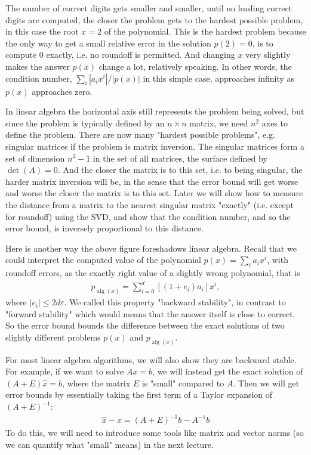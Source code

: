\documentclass[11pt]{article}
\numberwithin{equation}{section}
\begin{document}
The number of correct digits gets smaller and smaller, until no leading correct digits are computed, the closer the problem gets to the hardest possible problem, 
in this case the root $x=2$ of the polynomial. This is the hardest problem because the only way to get a small relative error in the solution $p(2)=0$, 
is to compute 0 exactly, i.e. no roundoff is permitted. And changing $x$ very slightly makes the answer $p(x)$ change a lot, relatively speaking. 
In other words, the condition number, $\sum_i |a_i x^i| / |p(x)|$ in this simple case, approaches infinity as $p(x)$ approaches zero.

In linear algebra the horizontal axis still represents the problem being solved, but since the problem is typically defined by an $n \times n$ matrix, 
we need $n^2$ axes to define the problem. There are now many "hardest possible problems", e.g. singular matrices if the problem is matrix inversion. 
The singular matrices form a set of dimension $n^2-1$ in the set of all matrices, the surface defined by $\operatorname{det}(A)=0$. And the closer the matrix is to this set, 
i.e. to being singular, the harder matrix inversion will be, in the sense that the error bound will get worse and worse the closer the matrix is to this set. 
Later we will show how to measure the distance from a matrix to the nearest singular matrix "exactly" (i.e. except for roundoff) using the SVD, 
and show that the condition number, and so the error bound, is inversely proportional to this distance.

Here is another way the above figure foreshadows linear algebra. Recall that we could interpret the computed value of the polynomial
$p(x) = \sum_i a_i x^i$, with roundoff errors, as the exactly right value of a slightly wrong polynomial, that is \begin{align*}
    p_{\operatorname{alg}(x)} = \sum_{i=0}^{d} [(1+e_i) a_i]x^i,
\end{align*}
where $|e_i| \leq 2d \varepsilon$. We called this property "backward stability", in contrast to "forward stability" which would means that the answer itself is close to correct. 
So the error bound bounds the difference between the exact solutions of two slightly different problems $p(x)$ and $p_{\operatorname{alg}(x)}$.

For most linear algebra algorithms, we will also show they are backward stable. For example, if we want to solve $Ax=b$, we will instead get the exact solution of $(A+E)\hat{x} = b$, 
where the matrix $E$ is "small" compared to $A$. Then we will get error bounds by essentially taking the first term of a Taylor expansion of $(A+E)^{-1}$:\begin{align*}
    \hat{x} - x = (A+E)^{-1}b - A^{-1}b
\end{align*}
To do this, we will need to introduce some tools like matrix and vector norms (so we can quantify what "small" means) in the next lecture.
\end{document}
